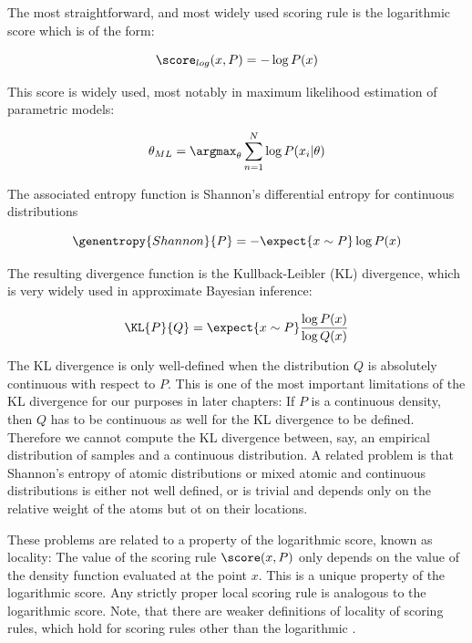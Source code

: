 The most straightforward, and most widely used scoring rule is the logarithmic score which is of the form:

\begin{equation}
	\score_{log}(x,P) = - \log P(x) 
\end{equation}

This score is widely used, most notably in maximum likelihood estimation of parametric models:

\begin{equation}
	\theta_{ML} = \argmax_{\theta} \sum_{n=1}^{N} \log P(x_i \vert \theta)
\end{equation}

The associated entropy function is Shannon's differential entropy for continuous distributions

\begin{equation}
	\genentropy{Shannon}{P} = - \expect{x\sim P} \log P(x)
\end{equation}

The resulting divergence function is the Kullback-Leibler (KL) divergence, which is very widely used in approximate Bayesian inference:

\begin{equation}
	\KL{P}{Q} = \expect{x\sim P} \frac{\log P(x)}{\log Q(x)}
\end{equation}

The KL divergence is only well-defined when the distribution $Q$ is absolutely continuous with respect to $P$. This is one of the most important limitations of the KL divergence for our purposes in later chapters: If $P$ is a continuous density, then $Q$ has to be continuous as well for the KL divergence to be defined. Therefore we cannot compute the KL divergence between, say, an empirical distribution of samples and a continuous distribution. A related problem is that Shannon's entropy of atomic distributions or mixed atomic and continuous distributions is either not well defined, or is trivial and depends only on the relative weight of the atoms but ot on their locations.

These problems are related to a property of the logarithmic score, known as locality: The value of the scoring rule $\score(x,P)$ only depends on the value of the density function evaluated at the point $x$. This is a unique property of the logarithmic score. Any strictly proper local scoring rule is analogous to the logarithmic score. Note, that there are weaker definitions of locality of scoring rules, which hold for scoring rules other than the logarithmic \citep{Parry2012, Dawid2012}.

